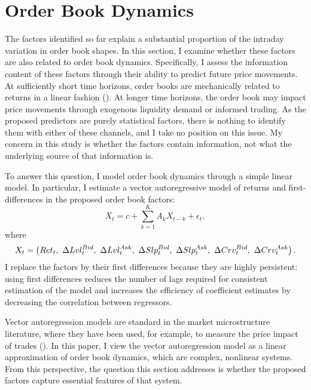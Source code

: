 \section{Order Book Dynamics}
	The factors identified so far explain a substantial proportion of the intraday variation in order book shapes. In this section, I examine whether these factors are also related to order book dynamics. Specifically, I assess the information content of these factors through their ability to predict future price movements. At sufficiently short time horizons, order books are mechanically related to returns in a linear fashion (\citet{Cont2013B}). At longer time horizons, the order book may impact price movements through exogenous liquidity demand or informed trading. As the proposed predictors are purely statistical factors, there is nothing to identify them with either of these channels, and I take no position on this issue. My concern in this study is whether the factors contain information, not what the underlying source of that information is.

	To answer this question, I model order book dynamics through a simple linear model. In particular, I estimate a vector autoregressive model of returns and first-differences in the proposed order book factors:
	\begin{equation}
		\label{eqn:var}
		X_t = c + \sum_{k=1}^{K} A_k X_{t-k} + \epsilon_t,
	\end{equation}
	where
	\begin{equation}
		X_t = \left( Ret_t, \ \Delta Lvl_t^{Bid}, \ \Delta Lvl_t^{Ask}, \ \Delta Slp_t^{Bid}, \ \Delta Slp_t^{Ask}, \ \Delta Crv_t^{Bid}, \ \Delta Crv_t^{Ask} \right). \notag
	\end{equation}
	I replace the factors by their first differences because they are highly persistent: using first differences reduces the number of lags required for consistent estimation of the model and increases the efficiency of coefficient estimates by decreasing the correlation between regressors.

	Vector autoregression models are standard in the market microstructure literature, where they have been used, for example, to measure the price impact of trades (\citet{Hasbrouck1991}). In this paper, I view the vector autoregression model as a linear approximation of order book dynamics, which are complex, nonlinear systems. From this perspective, the question this section addresses is whether the proposed factors capture essential features of that system.

